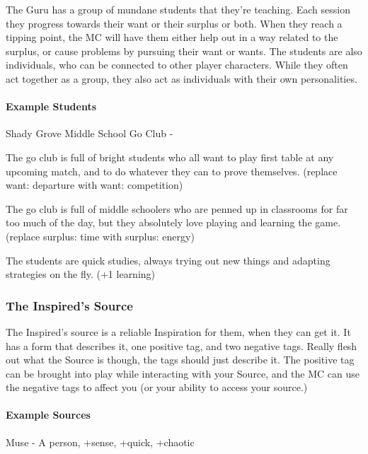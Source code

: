 \documentclass[
]{memoir}
\begin{document}
The Guru has a group of mundane students that they're teaching. Each
session they progress towards their want or their surplus or both. When
they reach a tipping point, the MC will have them either help out in a
way related to the surplus, or cause problems by pursuing their want or
wants. The students are also individuals, who can be connected to other
player characters. While they often act together as a group, they also
act as individuals with their own personalities.

\hypertarget{example-students}{%
\paragraph{Example Students}\label{example-students}}

Shady Grove Middle School Go Club -

The go club is full of bright students who all want to play first table
at any upcoming match, and to do whatever they can to prove themselves.
(replace want: departure with want: competition)

The go club is full of middle schoolers who are penned up in classrooms
for far too much of the day, but they absolutely love playing and
learning the game. (replace surplus: time with surplus: energy)

The students are quick studies, always trying out new things and
adapting strategies on the fly. (+1 learning)

\hypertarget{the-inspireds-source}{%
\subsubsection{The Inspired's Source}\label{the-inspireds-source}}

The Inspired's source is a reliable Inspiration for them, when they can
get it. It has a form that describes it, one positive tag, and two
negative tags. Really flesh out what the Source is though, the tags
should just describe it. The positive tag can be brought into play while
interacting with your Source, and the MC can use the negative tags to
affect you (or your ability to access your source.)

\hypertarget{example-sources}{%
\paragraph{Example Sources}\label{example-sources}}

Muse - A person, +sense, +quick, +chaotic
\end{document}
